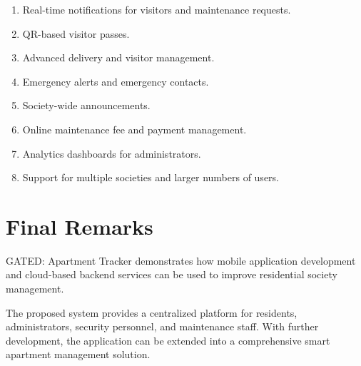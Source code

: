 \documentclass{tietreport}
\begin{document}
\begin{enumerate}
    \item Real-time notifications for visitors and
    maintenance requests.

    \item QR-based visitor passes.

    \item Advanced delivery and visitor management.

    \item Emergency alerts and emergency contacts.

    \item Society-wide announcements.

    \item Online maintenance fee and payment management.

    \item Analytics dashboards for administrators.

    \item Support for multiple societies and larger
    numbers of users.
\end{enumerate}

\section{Final Remarks}

GATED: Apartment Tracker demonstrates how mobile
application development and cloud-based backend
services can be used to improve residential society
management.

The proposed system provides a centralized platform for
residents, administrators, security personnel, and
maintenance staff. With further development, the
application can be extended into a comprehensive smart
apartment management solution.


\printbibliography[heading=bibintoc]
\end{document}
